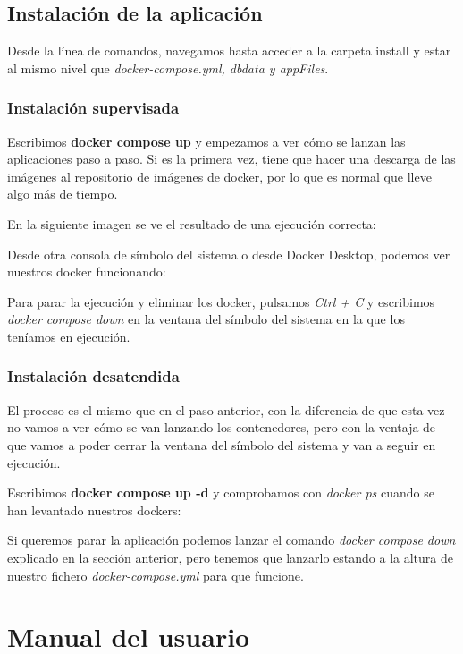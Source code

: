 \subsection{Instalación de la aplicación}

Desde la línea de comandos, navegamos hasta acceder a la carpeta install y estar al mismo nivel que \textit{docker-compose.yml, dbdata y appFiles}.

\subsubsection{Instalación supervisada}

Escribimos \textbf{docker compose up} y empezamos a ver cómo se lanzan las aplicaciones paso a paso. Si es la primera vez, tiene que hacer una descarga de las imágenes al repositorio de imágenes de docker, por lo que es normal que lleve algo más de tiempo.

En la siguiente imagen se ve el resultado de una ejecución correcta:

Desde otra consola de símbolo del sistema o desde Docker Desktop, podemos ver nuestros docker funcionando:

Para parar la ejecución y eliminar los docker, pulsamos \textit{Ctrl + C} y escribimos \textit{docker compose down} en la ventana del símbolo del sistema en la que los teníamos en ejecución.

\subsubsection{Instalación desatendida}

El proceso es el mismo que en el paso anterior, con la diferencia de que esta vez no vamos a ver cómo se van lanzando los contenedores, pero con la ventaja de que vamos a poder cerrar la ventana del símbolo del sistema y van a seguir en ejecución.

Escribimos \textbf{docker compose up -d} y comprobamos con \textit{docker ps} cuando se han levantado nuestros dockers:

Si queremos parar la aplicación podemos lanzar el comando \textit{docker compose down} explicado en la sección anterior, pero tenemos que lanzarlo estando a la altura de nuestro fichero \textit{docker-compose.yml} para que funcione.

\section{Manual del usuario}


